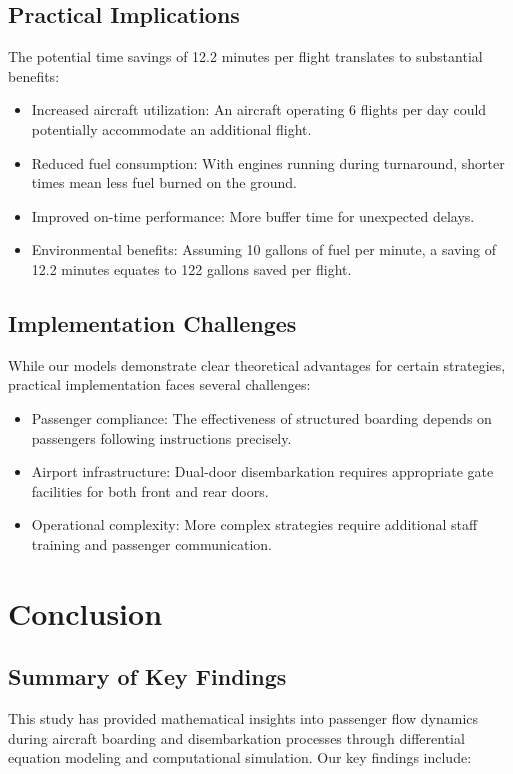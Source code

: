 \documentclass[12pt,a4paper]{article}
\begin{document}
\subsection{Practical Implications}
The potential time savings of 12.2 minutes per flight translates to substantial benefits:
\begin{itemize}
    \item Increased aircraft utilization: An aircraft operating 6 flights per day could potentially accommodate an additional flight.
    \item Reduced fuel consumption: With engines running during turnaround, shorter times mean less fuel burned on the ground.
    \item Improved on-time performance: More buffer time for unexpected delays.
    \item Environmental benefits: Assuming 10 gallons of fuel per minute, a saving of 12.2 minutes equates to 122 gallons saved per flight.
\end{itemize}

\subsection{Implementation Challenges}
While our models demonstrate clear theoretical advantages for certain strategies, practical implementation faces several challenges:
\begin{itemize}
    \item Passenger compliance: The effectiveness of structured boarding depends on passengers following instructions precisely.
    \item Airport infrastructure: Dual-door disembarkation requires appropriate gate facilities for both front and rear doors.
    \item Operational complexity: More complex strategies require additional staff training and passenger communication.
\end{itemize}

\section{Conclusion}

\subsection{Summary of Key Findings}
This study has provided mathematical insights into passenger flow dynamics during aircraft boarding and disembarkation processes through differential equation modeling and computational simulation. Our key findings include:
\end{document}

